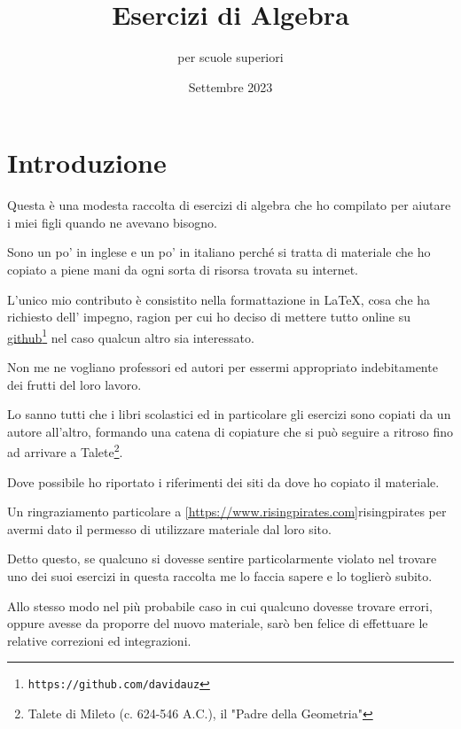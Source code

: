 \documentclass[a4paper,14pt]{extarticle}
\title{Esercizi di Algebra}
\author{per scuole superiori}
\date{Settembre 2023}
\begin{document}
\maketitle
\tableofcontents
\newpage

\section{Introduzione}

Questa è una modesta raccolta di esercizi di algebra che ho compilato per aiutare i
miei figli quando ne avevano bisogno.

Sono un po' in inglese e un po' in italiano perché
si tratta di materiale che ho copiato a piene mani da ogni sorta di risorsa trovata su internet.

L'unico mio contributo è consistito nella formattazione in  \LaTeX, cosa che ha richiesto 
dell' impegno, ragion per cui ho deciso di mettere tutto online su \href{https://github.com/davidauz}{github}\footnote{\texttt{https://github.com/davidauz}}
nel caso qualcun altro sia interessato.

Non me ne vogliano professori ed autori per essermi appropriato indebitamente dei frutti del loro lavoro.

Lo sanno tutti che i libri scolastici ed in particolare gli esercizi sono copiati da un autore all'altro,
formando una catena di copiature che si può seguire a ritroso fino ad arrivare a 
Talete\footnote{Talete di Mileto (c. 624-546 A.C.), il "Padre della Geometria"}.

Dove possibile ho riportato i riferimenti dei siti da dove ho copiato il materiale.

Un ringraziamento particolare a \ref{https://www.risingpirates.com}{risingpirates} per avermi dato il permesso di
utilizzare materiale dal loro sito.

Detto questo, se qualcuno si dovesse sentire particolarmente violato nel trovare uno dei suoi esercizi in 
questa raccolta me lo faccia sapere e lo toglierò subito.

Allo stesso modo nel più probabile caso in cui qualcuno dovesse trovare errori, oppure avesse da proporre del 
nuovo materiale, sarò ben felice di effettuare le relative correzioni ed integrazioni.













\end{document}
